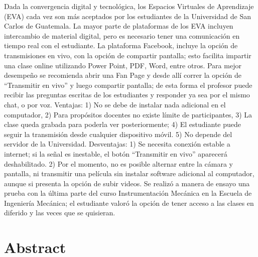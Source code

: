 \documentclass[11pt,spanish,Letterpaper,openany]{book}
\begin{document}
Dada la convergencia digital y tecnológica, los Espacios Virtuales de Aprendizaje (EVA) cada vez son más aceptados por los estudiantes de la Universidad de San Carlos de Guatemala. La mayor parte de plataformas de los EVA incluyen intercambio de material digital, pero es necesario tener una comunicación en tiempo real con el estudiante. La plataforma Facebook, incluye la opción de transmisiones en vivo, con la opción de compartir pantalla; esto facilita impartir una clase online utilizando Power Point, PDF, Word, entre otros. Para mejor desempeño se recomienda abrir una Fan Page y desde allí correr la opción de ``Transmitir en vivo'' y luego compartir pantalla; de esta forma el profesor puede recibir las preguntas escritas de los estudiantes y responder ya sea por el mismo chat, o por voz. Ventajas: 1) No se debe de instalar nada adicional en el computador, 2) Para propósitos docentes no existe límite de participantes, 3) La clase queda grabada para poderla ver posteriormente; 4) El estudiante puede seguir la transmisión desde cualquier dispositivo móvil. 5) No depende del servidor de la Universidad. Desventajas: 1) Se necesita conexión estable a internet; si la señal es inestable, el botón ``Transmitir en vivo'' aparecerá deshabilitado. 2) Por el momento, no es posible alternar entre la cámara y pantalla, ni transmitir una película sin instalar software adicional al computador, aunque si presenta la opción de subir videos. Se realizó a manera de ensayo una prueba con la última parte del curso Instrumentación Mecánica en la Escuela de Ingeniería Mecánica; el estudiante valoró la opción de tener acceso a las clases en diferido y las veces que se quisieran.

\hypertarget{abstract-4}{%
\section*{Abstract}\label{abstract-4}}
\end{document}
